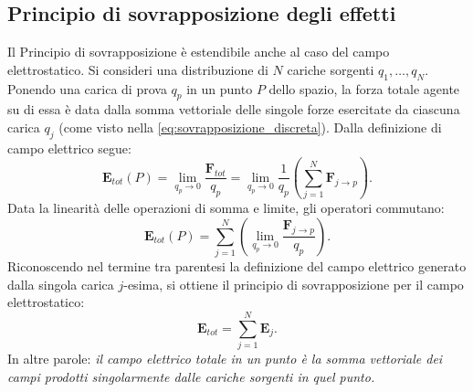 \documentclass[a4paper,11pt]{report}
\begin{document}
\subsection{Principio di sovrapposizione degli effetti}
Il Principio di sovrapposizione è estendibile anche al caso del campo elettrostatico. Si consideri una distribuzione di $N$ cariche sorgenti $q_1, \dots, q_N$. Ponendo una {carica di prova} $q_p$ in un punto $P$ dello spazio, la forza totale agente su di essa è data dalla somma vettoriale delle singole forze esercitate da ciascuna carica $q_j$ (come visto nella \eqref{eq:sovrapposizione_discreta}).
Dalla definizione di campo elettrico segue:
\begin{equation}
    \bm{E}_{tot}(P) = \lim_{q_p \to 0} \frac{\bm{F}_{tot}}{q_p} = \lim_{q_p \to 0} \frac{1}{q_p} \left( \sum_{j=1}^{N} \bm{F}_{j \to p} \right).
\end{equation}
Data la linearità delle operazioni di somma e limite, gli operatori commutano:
\begin{equation}
    \bm{E}_{tot}(P) = \sum_{j=1}^{N} \left( \lim_{q_p \to 0} \frac{\bm{F}_{j \to p}}{q_p} \right).
\end{equation}
Riconoscendo nel termine tra parentesi la definizione del campo elettrico generato dalla singola carica $j$-esima, si ottiene il principio di sovrapposizione per il campo elettrostatico:
\begin{equation}
    \bm{E}_{tot} = \sum_{j=1}^{N} \bm{E}_j.
    \label{eq:sovrapposizione_campo}
\end{equation}
In altre parole: \textit{il campo elettrico totale in un punto è la somma vettoriale dei campi prodotti singolarmente dalle cariche sorgenti in quel punto.}
\end{document}
